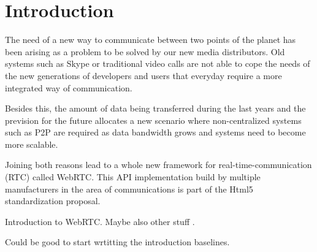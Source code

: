 \section{Introduction}

\thispagestyle{empty}

The need of a new way to communicate between two points of the planet has been arising as a problem
to be solved by our new media distributors. Old systems such as Skype or traditional video calls are not able
to cope the needs of the new generations of developers and users that everyday require a more integrated way of 
communication. 

Besides this, the amount of data being transferred during the last years and the prevision for the future allocates a new
scenario where non-centralized systems such as P2P are required as data bandwidth grows and systems need to become
more scalable. 

Joining both reasons lead to a whole new framework for real-time-communication (RTC) called WebRTC. This API implementation
build by multiple manufacturers in the area of communications is part of the Html5 standardization proposal.


Introduction to WebRTC.
Maybe also other stuff \cite{singh2009rate}.

Could be good to start wrtitting the introduction baselines.
